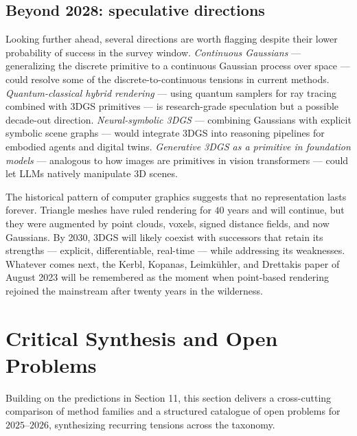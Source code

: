 \documentclass{article}
\begin{document}
\subsection{Beyond 2028: speculative directions}\label{beyond-2028-speculative-directions}

Looking further ahead, several directions are worth flagging despite their lower probability of success in the survey window. \emph{Continuous Gaussians} --- generalizing the discrete primitive to a continuous Gaussian process over space --- could resolve some of the discrete-to-continuous tensions in current methods. \emph{Quantum-classical hybrid rendering} --- using quantum samplers for ray tracing combined with 3DGS primitives --- is research-grade speculation but a possible decade-out direction. \emph{Neural-symbolic 3DGS} --- combining Gaussians with explicit symbolic scene graphs --- would integrate 3DGS into reasoning pipelines for embodied agents and digital twins. \emph{Generative 3DGS as a primitive in foundation models} --- analogous to how images are primitives in vision transformers --- could let LLMs natively manipulate 3D scenes.

The historical pattern of computer graphics suggests that no representation lasts forever. Triangle meshes have ruled rendering for \(40\) years and will continue, but they were augmented by point clouds, voxels, signed distance fields, and now Gaussians. By 2030, 3DGS will likely coexist with successors that retain its strengths --- explicit, differentiable, real-time --- while addressing its weaknesses. Whatever comes next, the Kerbl, Kopanas, Leimkühler, and Drettakis paper of August 2023 will be remembered as the moment when point-based rendering rejoined the mainstream after twenty years in the wilderness.

\section{Critical Synthesis and Open Problems}\label{critical-synthesis-and-open-problems}

Building on the predictions in Section 11, this section delivers a cross-cutting comparison of method families and a structured catalogue of open problems for \(2025\)--\(2026\), synthesizing recurring tensions across the taxonomy.
\end{document}
